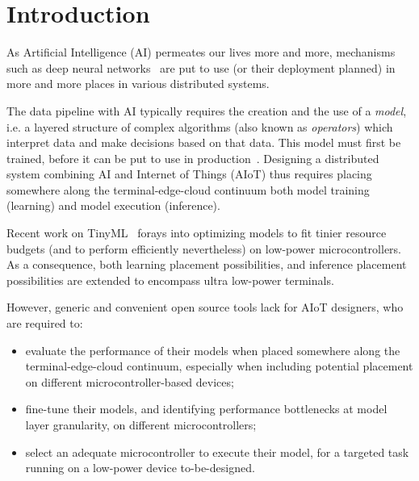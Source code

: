 \section{Introduction}
% 
% 
% 
% 
As Artificial Intelligence (AI) permeates our lives more and more, mechanisms such as deep neural networks~\cite{sze2017dnn} are put to use (or their deployment planned) in more and more places in various distributed systems. 

The data pipeline with AI typically requires the creation and the use of a \emph{model}, i.e. a layered structure of complex algorithms (also known as \emph{operators}) which interpret data and make decisions based on that data. This model must first be trained, before it can be put to use in production~\cite{sze2017dnn}.
Designing a distributed system combining AI and Internet of Things (AIoT) thus requires placing somewhere along the terminal-edge-cloud continuum both model training (learning) and model execution (inference).

Recent work on TinyML~\cite{sanchez2020tinyml,ray2022tinyml-review} forays into optimizing models to fit tinier resource budgets (and to perform efficiently nevertheless) on low-power microcontrollers. As a consequence, both learning placement possibilities, and inference placement possibilities are extended to encompass ultra low-power terminals.

However, generic and convenient open source tools lack for AIoT designers, who are required to:
\begin{itemize}
    \item evaluate the performance of their models when placed somewhere along the terminal-edge-cloud continuum, especially when including potential placement on different microcontroller-based devices;
    \item fine-tune their models, and identifying performance bottlenecks at model layer granularity, on different microcontrollers;
    \item select an adequate microcontroller to execute their model, for a targeted task running on a low-power device to-be-designed.
\end{itemize}

